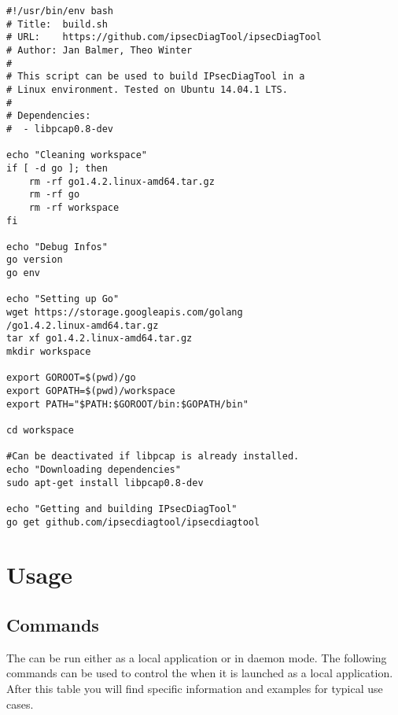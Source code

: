 \lstset{language=bash, breaklines=true}
\begin{lstlisting}[caption=Install script]
#!/usr/bin/env bash
# Title:  build.sh                                       
# URL:    https://github.com/ipsecDiagTool/ipsecDiagTool
# Author: Jan Balmer, Theo Winter
#    
# This script can be used to build IPsecDiagTool in a
# Linux environment. Tested on Ubuntu 14.04.1 LTS.
#
# Dependencies:
#  - libpcap0.8-dev

echo "Cleaning workspace"
if [ -d go ]; then
	rm -rf go1.4.2.linux-amd64.tar.gz
	rm -rf go
    rm -rf workspace
fi

echo "Debug Infos"
go version
go env

echo "Setting up Go"
wget https://storage.googleapis.com/golang
/go1.4.2.linux-amd64.tar.gz
tar xf go1.4.2.linux-amd64.tar.gz
mkdir workspace

export GOROOT=$(pwd)/go
export GOPATH=$(pwd)/workspace
export PATH="$PATH:$GOROOT/bin:$GOPATH/bin"

cd workspace

#Can be deactivated if libpcap is already installed.
echo "Downloading dependencies"
sudo apt-get install libpcap0.8-dev

echo "Getting and building IPsecDiagTool"
go get github.com/ipsecdiagtool/ipsecdiagtool
\end{lstlisting}


\section{Usage}

\subsection{Commands}
The \entool{} can be run either as a local application or in daemon mode. The following commands can be used to control the \entool{} when it is launched as a local application. After this table you will find specific information and examples for typical use cases.

